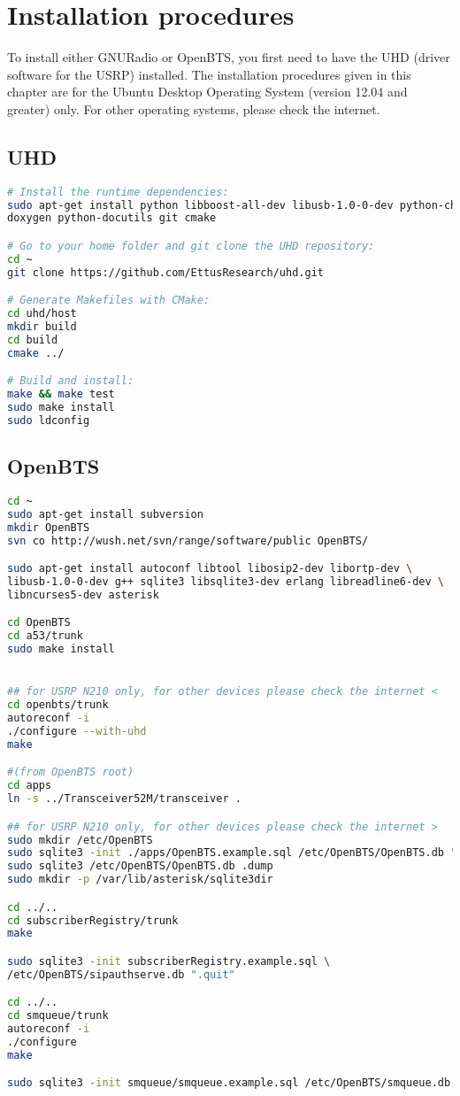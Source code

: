\chapter{Installation procedures}
To install either GNURadio or OpenBTS, you first need to have the UHD (driver
software for the USRP) installed. The installation procedures given in this 
chapter are for the Ubuntu Desktop Operating System (version 12.04 and
greater) only. For other operating systems, please check the internet.
\section{UHD}
\begin{lstlisting}[language=bash]
# Install the runtime dependencies:
sudo apt-get install python libboost-all-dev libusb-1.0-0-dev python-cheetah \
doxygen python-docutils git cmake

# Go to your home folder and git clone the UHD repository:
cd ~
git clone https://github.com/EttusResearch/uhd.git

# Generate Makefiles with CMake:
cd uhd/host
mkdir build
cd build
cmake ../

# Build and install:
make && make test
sudo make install
sudo ldconfig
\end{lstlisting}


\section{OpenBTS}

\begin{lstlisting}[language=bash]
cd ~
sudo apt-get install subversion
mkdir OpenBTS
svn co http://wush.net/svn/range/software/public OpenBTS/

sudo apt-get install autoconf libtool libosip2-dev libortp-dev \
libusb-1.0-0-dev g++ sqlite3 libsqlite3-dev erlang libreadline6-dev \
libncurses5-dev asterisk

cd OpenBTS
cd a53/trunk
sudo make install


## for USRP N210 only, for other devices please check the internet <
cd openbts/trunk
autoreconf -i
./configure --with-uhd
make

#(from OpenBTS root)
cd apps
ln -s ../Transceiver52M/transceiver .

## for USRP N210 only, for other devices please check the internet >
sudo mkdir /etc/OpenBTS
sudo sqlite3 -init ./apps/OpenBTS.example.sql /etc/OpenBTS/OpenBTS.db ".quit"
sudo sqlite3 /etc/OpenBTS/OpenBTS.db .dump
sudo mkdir -p /var/lib/asterisk/sqlite3dir

cd ../..
cd subscriberRegistry/trunk
make

sudo sqlite3 -init subscriberRegistry.example.sql \
/etc/OpenBTS/sipauthserve.db ".quit"

cd ../..
cd smqueue/trunk
autoreconf -i
./configure
make

sudo sqlite3 -init smqueue/smqueue.example.sql /etc/OpenBTS/smqueue.db ".quit"
\end{lstlisting}


